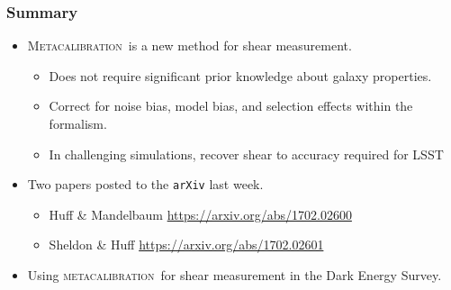 \documentclass{beamer}
\newcommand{\mcal}{\textsc{metacalibration}}
\newcommand{\Mcal}{\textsc{Metacalibration}}
\begin{document}
\frame
{
    \frametitle{Summary}
    \begin{itemize}
        \item \Mcal\ is a new method for shear measurement.
            \begin{itemize}
                \item Does not require significant prior knowledge about galaxy properties.
                \item Correct for noise bias, model bias, and selection effects within 
                    the formalism.
                \item In challenging simulations, recover shear to accuracy required
                    for LSST
            \end{itemize}

        \item Two papers posted to the \texttt{arXiv} last week.
            \begin{itemize}
                \item Huff \& Mandelbaum \url{https://arxiv.org/abs/1702.02600}
                \item Sheldon \& Huff \url{https://arxiv.org/abs/1702.02601}
            \end{itemize}

        \item Using \mcal\ for shear measurement in the Dark Energy Survey.

    \end{itemize}
}
\end{document}

